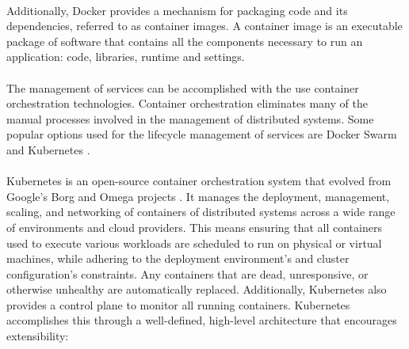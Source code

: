 \paragraph{}

Additionally, Docker provides a mechanism for packaging code and its dependencies, referred to as container images.
A container image is an executable package of software that contains all the components necessary to run an application: code, libraries, runtime and settings.

\paragraph{}

The management of services can be accomplished with the use container orchestration technologies.
Container orchestration eliminates many of the manual processes involved in the management of distributed systems.
Some popular options used for the lifecycle management of services are Docker Swarm \cite{docker2016swarm} and Kubernetes \cite{kubernetes}.

\paragraph{}

Kubernetes \cite{kubernetes} is an open-source container orchestration system that evolved from Google's Borg and Omega projects \cite{burns2016borg}.
It manages the deployment, management, scaling, and networking of containers of distributed systems across a wide range of environments
and cloud providers.
This means ensuring that all containers used to execute various workloads are scheduled to run on physical or virtual machines,
while adhering to the deployment environment's and cluster configuration's constraints.
Any containers that are dead, unresponsive, or otherwise unhealthy are automatically replaced.
Additionally, Kubernetes also provides a control plane to monitor all running containers.
Kubernetes accomplishes this through a well-defined, high-level architecture that encourages extensibility:

